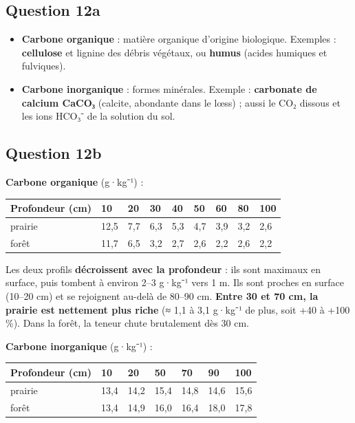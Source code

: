 \documentclass[11pt,a4paper]{article}
\providecommand{\tightlist}{\setlength{\itemsep}{0pt}\setlength{\parskip}{0pt}}
\begin{document}
\hypertarget{question-12a}{%
\subsection{Question 12a}\label{question-12a}}

\begin{itemize}
\tightlist
\item
  \textbf{Carbone organique} : matière organique d'origine biologique. Exemples : \textbf{cellulose} et lignine des débris végétaux, ou \textbf{humus} (acides humiques et fulviques).
\item
  \textbf{Carbone inorganique} : formes minérales. Exemple : \textbf{carbonate de calcium CaCO₃} (calcite, abondante dans le lœss) ; aussi le CO₂ dissous et les ions HCO₃⁻ de la solution du sol.
\end{itemize}

\hypertarget{question-12b}{%
\subsection{Question 12b}\label{question-12b}}

\textbf{Carbone organique} (g·kg⁻¹) :

\begin{longtable}[]{@{}lllllllll@{}}
\toprule\noalign{}
Profondeur (cm) & 10 & 20 & 30 & 40 & 50 & 60 & 80 & 100 \\
\midrule\noalign{}
\endhead
\bottomrule\noalign{}
\endlastfoot
prairie & 12,5 & 7,7 & 6,3 & 5,3 & 4,7 & 3,9 & 3,2 & 2,6 \\
forêt & 11,7 & 6,5 & 3,2 & 2,7 & 2,6 & 2,2 & 2,6 & 2,2 \\
\end{longtable}

Les deux profils \textbf{décroissent avec la profondeur} : ils sont maximaux en surface, puis tombent à environ 2--3 g·kg⁻¹ vers 1 m. Ils sont proches en surface (10--20 cm) et se rejoignent au-delà de 80--90 cm. \textbf{Entre 30 et 70 cm, la prairie est nettement plus riche} (≈ 1,1 à 3,1 g·kg⁻¹ de plus, soit +40 à +100 \%). Dans la forêt, la teneur chute brutalement dès 30 cm.

\textbf{Carbone inorganique} (g·kg⁻¹) :

\begin{longtable}[]{@{}lllllll@{}}
\toprule\noalign{}
Profondeur (cm) & 10 & 20 & 50 & 70 & 90 & 100 \\
\midrule\noalign{}
\endhead
\bottomrule\noalign{}
\endlastfoot
prairie & 13,4 & 14,2 & 15,4 & 14,8 & 14,6 & 15,6 \\
forêt & 13,4 & 14,9 & 16,0 & 16,4 & 18,0 & 17,8 \\
\end{longtable}
\end{document}
